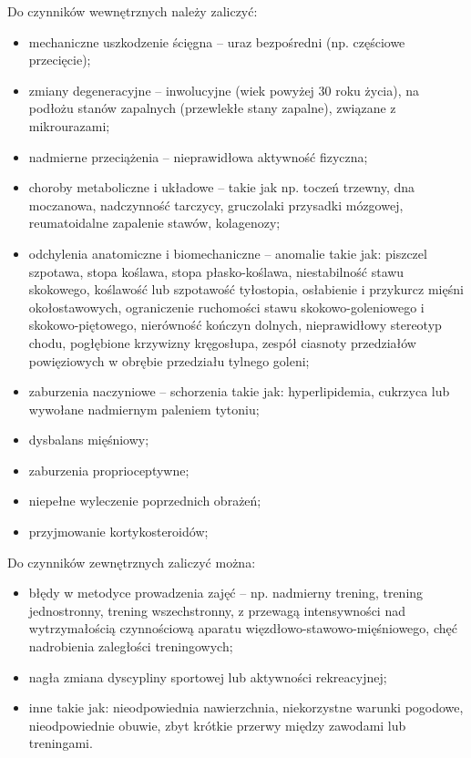 Do czynników wewnętrznych należy zaliczyć:
\begin{itemize}
	\item mechaniczne uszkodzenie ścięgna -- uraz bezpośredni (np. częściowe przecięcie);
	\item zmiany degeneracyjne -- inwolucyjne (wiek powyżej 30 roku życia), na podłożu stanów zapalnych (przewlekłe stany zapalne), związane z mikrourazami;
	\item nadmierne przeciążenia -- nieprawidłowa aktywność fizyczna;
	\item choroby metaboliczne i układowe -- takie jak np. toczeń trzewny, dna moczanowa, nadczynność tarczycy, gruczolaki przysadki mózgowej, reumatoidalne zapalenie stawów, kolagenozy;
	\item odchylenia anatomiczne i biomechaniczne -- anomalie takie jak: piszczel szpotawa, stopa koślawa, stopa płasko-koślawa, niestabilność stawu skokowego, koślawość lub szpotawość tyłostopia, osłabienie i przykurcz mięśni okołostawowych, ograniczenie ruchomości stawu skokowo-goleniowego i skokowo-piętowego, nierówność kończyn dolnych, nieprawidłowy stereotyp chodu, pogłębione krzywizny kręgosłupa, zespół ciasnoty przedziałów powięziowych w obrębie przedziału tylnego goleni;
	\item zaburzenia naczyniowe -- schorzenia takie jak: hyperlipidemia, cukrzyca lub wywołane nadmiernym paleniem tytoniu;
	\item dysbalans mięśniowy;
	\item zaburzenia proprioceptywne;
	\item niepełne wyleczenie poprzednich obrażeń;
	\item przyjmowanie kortykosteroidów;
\end{itemize}

Do czynników zewnętrznych zaliczyć można:
\begin{itemize}
	\item błędy w metodyce prowadzenia zajęć -- np. nadmierny trening, trening jednostronny, trening wszechstronny, z przewagą intensywności nad wytrzymałością czynnościową aparatu więzdłowo-stawowo-mięśniowego, chęć nadrobienia zaległości treningowych;
	\item nagła zmiana dyscypliny sportowej lub aktywności rekreacyjnej;
	\item inne takie jak: nieodpowiednia nawierzchnia, niekorzystne warunki pogodowe, nieodpowiednie obuwie, zbyt krótkie przerwy między zawodami lub treningami.
\end{itemize}

